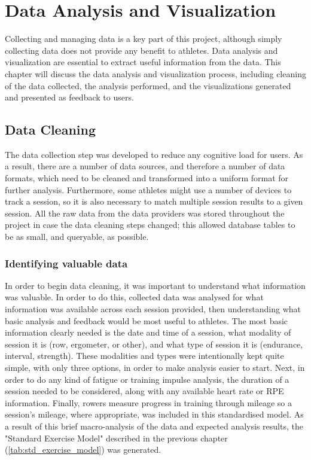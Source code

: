 \chapter{\label{chap:data-anyl-viz}Data Analysis and Visualization}
Collecting and managing data is a key part of this project, although simply collecting data does not provide any benefit to athletes. Data analysis and visualization are essential to extract useful information from the data. This chapter will discuss the data analysis and visualization process, including cleaning of the data collected, the analysis performed, and the visualizations generated and presented as feedback to users.

\section{\label{sec:data-cleaning}Data Cleaning}
The data collection step was developed to reduce any cognitive load for users. As a result, there are a number of data sources, and therefore a number of data formats, which need to be cleaned and transformed into a uniform format for further analysis. Furthermore, some athletes might use a number of devices to track a session, so it is also necessary to match multiple session results to a given session. All the raw data from the data providers was stored throughout the project in case the data cleaning steps changed; this allowed database tables to be as small, and queryable, as possible.
\subsection{Identifying valuable data}
In order to begin data cleaning, it was important to understand what information was valuable. In order to do this, collected data was analysed for what information was available across each session provided, then understanding what basic analysis and feedback would be most useful to athletes. The most basic information clearly needed is the date and time of a session, what modality of session it is (row, ergometer, or other), and what type of session it is (endurance, interval, strength). These modalities and types were intentionally kept quite simple, with only three options, in order to make analysis easier to start. Next, in order to do any kind of fatigue or training impulse analysis, the duration of a session needed to be considered, along with any available heart rate or RPE information. Finally, rowers measure progress in training through mileage so a session's mileage, where appropriate, was included in this standardised model. As a result of this brief macro-analysis of the data and expected analysis results, the "Standard Exercise Model" described in the previous chapter (\autoref{tab:std_exercise_model}) was generated.

